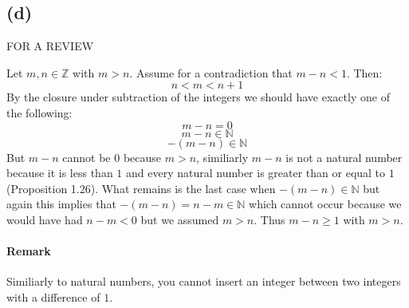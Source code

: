 \documentclass{article}
\begin{document}
\subsection*{(d)}
\begin{center}
    FOR A REVIEW
\end{center}
Let \(m, n \in \mathbb{Z}\) with \(m > n\). Assume for a contradiction that \(m - n < 1\). Then:
\begin{equation*}
    n < m < n + 1
\end{equation*}
By the closure under subtraction of the integers we should have exactly one of the following:
\begin{equation*}
    m - n = 0
\end{equation*}
\begin{equation*}
    m - n \in \mathbb{N}
\end{equation*}
\begin{equation*}
    - (m - n) \in \mathbb{N}
\end{equation*}
But \(m - n\) cannot be \(0\) because \(m > n\), similiarly \(m - n\) is not a natural number because it is less than \(1\)
and every natural number is greater than or equal to \(1\) (Proposition 1.26). What remains is the last case when
\(- (m - n) \in \mathbb{N}\) but again this implies that \(-(m - n) = n - m \in \mathbb{N}\) which cannot occur because 
we would have had \(n - m < 0\) but we assumed \(m > n\). Thus \(m - n \geq 1\) with \(m > n\).

\paragraph*{Remark} Similiarly to natural numbers, you cannot insert an integer between two integers with a difference of \(1\).
\end{document}
